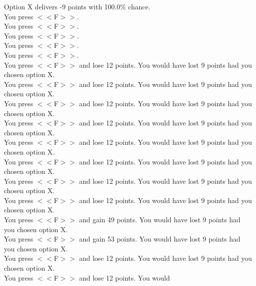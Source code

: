 \documentclass[pdflatex,sn-nature]{sn-jnl}%
\theoremstyle{thmstyleone}%
\theoremstyle{thmstyletwo}%
\theoremstyle{thmstylethree}%
\begin{document}
Option X delivers -9 points with 100.0\% chance. $~$\\ 
You press $<<$F$>>$. $~$\\ 
You press $<<$F$>>$. $~$\\ 
You press $<<$F$>>$. $~$\\ 
You press $<<$F$>>$. $~$\\ 
You press $<<$F$>>$. $~$\\ 
You press $<<$F$>>$ and lose 12 points. You would have lost 9 points had you chosen option X. $~$\\ 
You press $<<$F$>>$ and lose 12 points. You would have lost 9 points had you chosen option X. $~$\\ 
You press $<<$F$>>$ and lose 12 points. You would have lost 9 points had you chosen option X. $~$\\ 
You press $<<$F$>>$ and lose 12 points. You would have lost 9 points had you chosen option X. $~$\\ 
You press $<<$F$>>$ and lose 12 points. You would have lost 9 points had you chosen option X. $~$\\ 
You press $<<$F$>>$ and lose 12 points. You would have lost 9 points had you chosen option X. $~$\\ 
You press $<<$F$>>$ and lose 12 points. You would have lost 9 points had you chosen option X. $~$\\ 
You press $<<$F$>>$ and lose 12 points. You would have lost 9 points had you chosen option X. $~$\\ 
You press $<<$F$>>$ and gain 49 points. You would have lost 9 points had you chosen option X. $~$\\ 
You press $<<$F$>>$ and gain 53 points. You would have lost 9 points had you chosen option X. $~$\\ 
You press $<<$F$>>$ and lose 12 points. You would have lost 9 points had you chosen option X. $~$\\ 
You press $<<$F$>>$ and lose 12 points. You would 
\end{document}
